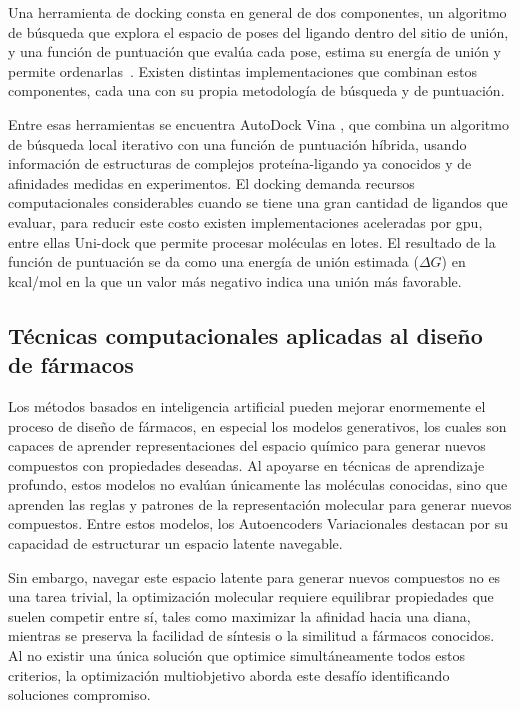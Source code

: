 Una herramienta de docking consta en general de dos componentes, un algoritmo de búsqueda que explora el espacio de poses del ligando dentro del sitio de unión, y una función de puntuación que evalúa cada pose, estima su energía de unión y permite ordenarlas~\cite{Pagadala2017docking}. Existen distintas implementaciones que combinan estos componentes, cada una con su propia metodología de búsqueda y de puntuación.

Entre esas herramientas se encuentra AutoDock Vina \cite{Trott2010Vina}, que combina un algoritmo de búsqueda local iterativo con una función de puntuación híbrida, usando información de estructuras de complejos proteína-ligando ya conocidos y de afinidades medidas en experimentos. El docking demanda recursos computacionales considerables cuando se tiene una gran cantidad de ligandos que evaluar, para reducir este costo existen implementaciones aceleradas por \gls{gpu}, entre ellas Uni-dock \cite{Yu2023UniDock} que permite procesar moléculas en lotes. El resultado de la función de puntuación se da como una energía de unión estimada ($\Delta G$) en kcal/mol \cite{Pagadala2017docking} en la que un valor más negativo indica una unión más favorable.

\subsection{Técnicas computacionales aplicadas al diseño de fármacos}
\label{subsec:tecnicas_computacionales}
\label{sec:modelos_generativos}

Los métodos basados en inteligencia artificial pueden mejorar enormemente el proceso de diseño de fármacos, en especial los modelos generativos, los cuales son capaces de aprender representaciones del espacio químico para generar nuevos compuestos con propiedades deseadas. Al apoyarse en técnicas de aprendizaje profundo, estos modelos no evalúan únicamente las moléculas conocidas, sino que aprenden las reglas y patrones de la representación molecular para generar nuevos compuestos. Entre estos modelos, los Autoencoders Variacionales destacan por su capacidad de estructurar un espacio latente navegable. 

Sin embargo, navegar este espacio latente para generar nuevos compuestos no es una tarea trivial, la optimización molecular requiere equilibrar propiedades que suelen competir entre sí, tales como maximizar la afinidad hacia una diana, mientras se preserva la facilidad de síntesis o la similitud a fármacos conocidos. Al no existir una única solución que optimice simultáneamente todos estos criterios, la optimización multiobjetivo aborda este desafío identificando soluciones compromiso. 

